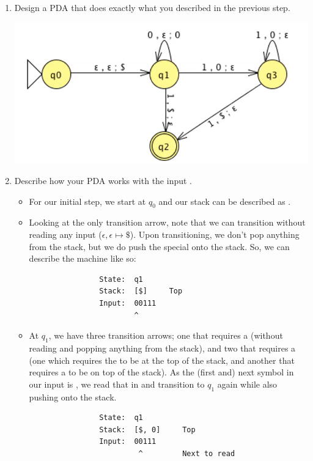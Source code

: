 \documentclass[letterpaper]{article}
\begin{document}
\begin{enumerate}
    \item Design a PDA that does exactly what you described in the previous step. 
    \begin{mdframed}[nobreak=true]
        \begin{center}
            \includegraphics[scale=0.7]{assets/pda_1.png}
        \end{center}
    \end{mdframed}

    \item Describe how your PDA works with the input .
    \begin{mdframed}[]
        \begin{itemize}
            \item For our initial step, we start at $q_0$ and our stack can be described as \code{[]}.
            \item Looking at the only transition arrow, note that we can transition without reading any input ($\epsilon, \epsilon \mapsto \$$). Upon transitioning, we don't pop anything from the stack, but we do push the special \code{\$} onto the stack. So, we can describe the machine like so: 
            \begin{verbatim}
                State:  q1
                Stack:  [$]     Top 
                Input:  00111
                        ^
            \end{verbatim}

            \item At $q_1$, we have three transition arrows; one that requires a  (without reading and popping anything from the stack), and two that requires a  (one which requires the \code{\$} to be at the top of the stack, and another that requires a  to be on top of the stack). As the (first and) next symbol in our input is , we read that in and transition to $q_1$ again while also pushing  onto the stack. 
            \begin{verbatim}
                State:  q1
                Stack:  [$, 0]     Top 
                Input:  00111
                         ^         Next to read
            \end{verbatim}


\end{itemize}
\end{mdframed}
\end{enumerate}
\end{document}
